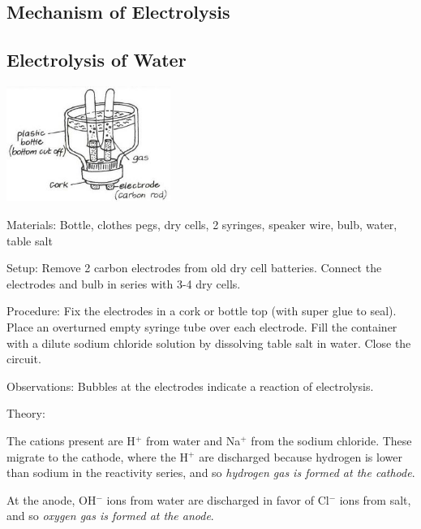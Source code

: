 \begin{multicols}{2}

\section*{Mechanism of Electrolysis}


\subsection{Electrolysis of Water} 

\begin{center}
\includegraphics[width=0.4\textwidth]{./img/vso/electrolysis-nacl.jpg}
\end{center}

\begin{description*}
\item[Materials:]{Bottle, clothes pegs, dry cells, 2 syringes, speaker wire, bulb, water, table salt}
\item[Setup:]{Remove 2 carbon electrodes from old dry cell batteries. Connect the electrodes and bulb in series with 3-4 dry cells.}
\item[Procedure:]{Fix the electrodes in a cork or bottle top (with super glue to seal). Place an overturned empty syringe tube over each electrode. Fill the container with a dilute sodium chloride solution by dissolving table salt in water. Close the circuit.}
\item[Observations:]{Bubbles at the electrodes indicate a reaction of electrolysis.}
\item[Theory:]{The cations present are H$^+$ from water and Na$^+$ from the sodium chloride. These migrate to the cathode, where the H$^+$ are discharged because hydrogen is lower than sodium in the reactivity series, and so \emph{hydrogen gas is formed at the cathode}. 

At the anode, OH$^-$ ions from water are discharged in favor of Cl$^-$ ions from salt, and so \emph{oxygen gas is formed at the anode}.

}
\end{description*}
\end{multicols}

